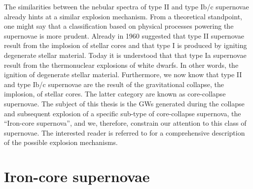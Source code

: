 The similarities between the nebular spectra of type II and type Ib/c supernovae already hints at a similar explosion mechanism. From a theoretical standpoint, one might say that a classification based on physical processes
powering the supernovae is more prudent. Already in 1960 \cite{hoyle_60} suggested that type II supernovae result from
the implosion of stellar cores and that type I is produced by igniting degenerate stellar material. Today it is understood that
that type Ia supernovae result from the thermonuclear explosions of white dwarfs. In other words, the ignition of degenerate stellar material.
Furthermore, we now know that type II and type Ib/c supernovae are the result of the gravitational collapse, the implosion, of stellar cores.
The latter category are known as core-collapse supernovae. The subject of this thesis is the GWs generated during the collapse and subsequent explosion of a specific sub-type of core-collapse supernova, the ``Iron-core supernova'', and we, therefore, 
constrain our attention to this class of supernovae. The interested reader is referred to \cite{janka_12} for a comprehensive description of the possible explosion mechanisms.

\section{Iron-core supernovae}

